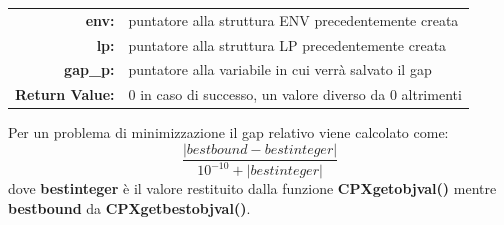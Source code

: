 \begin{itemize}
{\begin{table}[h]
\begin{tabular}{rl}
\textbf{env:} & {puntatore alla struttura ENV precedentemente creata}\\
\textbf{lp:} & {puntatore alla struttura LP precedentemente creata}\\
\textbf{gap\_p:} & {puntatore alla variabile in cui verrà salvato il gap}\\
\textbf{Return Value:} & {0 in caso di successo, un valore diverso da 0 altrimenti}\\
\end{tabular}
\end{table}
Per un problema di minimizzazione il gap relativo viene calcolato come:
$$\frac{|bestbound - bestinteger|}{10^{-10}+|bestinteger|}$$
dove \textbf{bestinteger} è il valore restituito dalla funzione \textbf{CPXgetobjval()} mentre \textbf{bestbound} da \textbf{CPXgetbestobjval()}.
}
\end{itemize}

